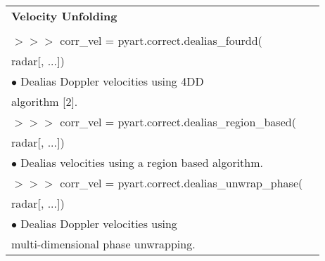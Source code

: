 \documentclass[potrait, z1paper, fontscale=0.33]{baposter} %
\begin{document}
\begin{poster}
{\begin{flushleft}
\begin{tabular}{@{}ll@{}}
\\
\multicolumn{2}{l}{\cellcolor[HTML]{DDFFFF}\bf Velocity Unfolding} \\
\\
$>$$>$$>$ corr\_vel = pyart.correct.dealias\_fourdd(\\
\-\hspace{1.5cm} radar[, ...])\\
\-\hspace{0.4cm} $\bullet$ Dealias Doppler velocities using 4DD\\
\-\hspace{0.7cm} algorithm [2].\\
$>$$>$$>$ corr\_vel = pyart.correct.dealias\_region\_based(\\
\-\hspace{1.5cm} radar[, ...])\\
\-\hspace{0.4cm} $\bullet$ Dealias velocities using a region based algorithm.\\
$>$$>$$>$ corr\_vel = pyart.correct.dealias\_unwrap\_phase(\\
\-\hspace{1.5cm} radar[, ...])\\
\-\hspace{0.4cm} $\bullet$ Dealias Doppler velocities using\\
\-\hspace{0.7cm} multi-dimensional phase unwrapping.\\
\end{tabular}


\end{flushleft}}
\end{poster}
\end{document}

